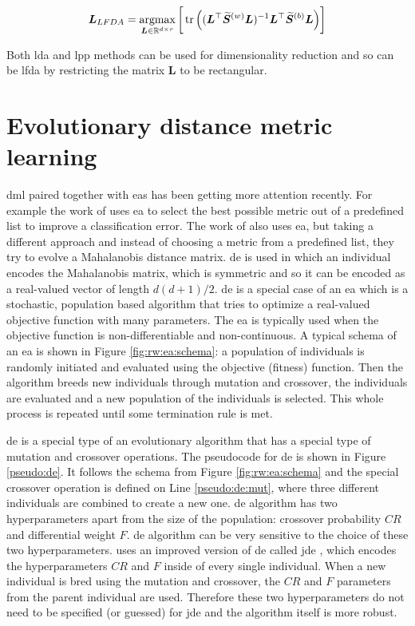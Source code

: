 \documentclass[12pt,a4paper]{report}
\begin{document}
\begin{equation}
\bm{L}_{LFDA} = \operatorname*{argmax}_{\bm{L} \in \mathbb{R}^{d \times r}} \bigg[\operatorname*{tr}\Big( ( \bm{L}^\top\widetilde{\bm{S}}^{(w)}\bm{L} )^{-1} \bm{L}^\top\widetilde{\bm{S}}^{(b)}\bm{L} \Big)\bigg] \label{eq:rw:lfda:objective}
\end{equation}

Both \ac{lda} and \ac{lpp} methods can be used for dimensionality reduction and so can be \ac{lfda} by restricting the matrix $\bm{L}$ to be rectangular.

\section{Evolutionary distance metric learning} \label{chap:rw:fukui}


\Acl{dml} paired together with \acp{ea} has been getting more attention recently. For example the work of \cite{koloseni2012optimized} uses \ac{ea} to select the best possible metric out of a predefined list to improve a classification error. The work of \cite{fukui2013evolutionary} also uses \ac{ea}, but taking a different approach and instead of choosing a metric from a predefined list, they try to evolve a Mahalanobis distance matrix. \Acl{de} is used in which an individual encodes the Mahalanobis matrix, which is symmetric and so it can be encoded as a real-valued vector of length $d(d+1)/2$. \Acl{de} is a special case of an \ac{ea} which is a stochastic, population based algorithm that tries to optimize a real-valued objective function with many parameters. The \ac{ea} is typically used when the objective function is non-differentiable and non-continuous. A typical schema of an \ac{ea} is shown in Figure \ref{fig:rw:ea:schema}: a population of individuals is randomly initiated and evaluated using the objective (fitness) function. Then the algorithm breeds new individuals through mutation and crossover, the individuals are evaluated and a new population of the individuals is selected. This whole process is repeated until some termination rule is met.

\Ac{de} is a special type of an evolutionary algorithm that has a special type of mutation and crossover operations. The pseudocode for \ac{de} is shown in Figure \ref{pseudo:de}. It follows the schema from Figure \ref{fig:rw:ea:schema} and the special crossover operation is defined on Line \ref{pseudo:de:mut}, where three different individuals are combined to create a new one. \ac{de} algorithm has two hyperparameters apart from the size of the population: crossover probability $CR$ and differential weight $F$. \ac{de} algorithm can be very sensitive to the choice of these two hyperparameters. \cite{fukui2013evolutionary} uses an improved version of \ac{de} called \acf{jde} \citep{brest2006self}, which encodes the hyperparameters $CR$ and $F$ inside of every single individual. When a new individual is bred using the mutation and crossover, the $CR$ and $F$ parameters from the parent individual are used. Therefore these two hyperparameters do not need to be specified (or guessed) for \ac{jde} and the algorithm itself is more robust.
\end{document}
